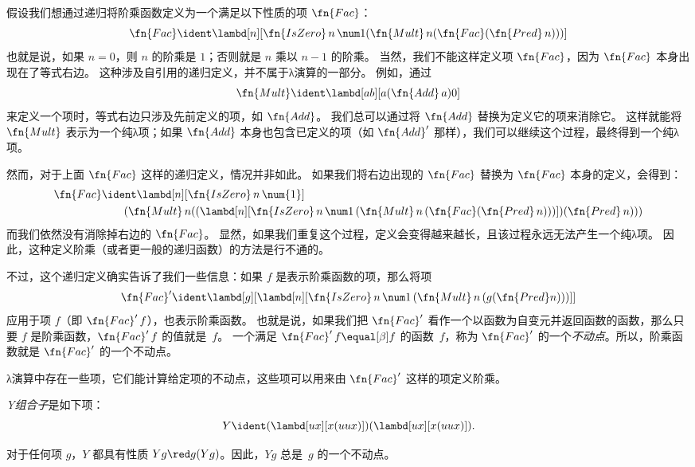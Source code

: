 \documentclass[../../../include/open-logic-section]{subfiles}
\begin{document}


假设我们想通过递归将阶乘函数定义为一个满足以下性质的项 $\fn{Fac}$：
\[
\fn{Fac} \ident \lambd[n][\fn{IsZero}\, n\, \num 1 (\fn{Mult}\, n (\fn{Fac}(\fn{Pred} \, n)))]
\]
也就是说，如果 $n = 0$，则 $n$ 的阶乘是 $1$；否则就是 $n$ 乘以 $n-1$ 的阶乘。
当然，我们不能这样定义项 $\fn{Fac}$，因为 $\fn{Fac}$ 本身出现在了等式右边。
这种涉及自引用的递归定义，并不属于λ演算的一部分。
例如，通过
\[
\fn{Mult} \ident \lambd[ab][a (\fn{Add}\, a) 0]
\]
来定义一个项时，等式右边只涉及先前定义的项，如 $\fn{Add}$。
我们总可以通过将 $\fn{Add}$ 替换为定义它的项来消除它。
这样就能将 $\fn{Mult}$ 表示为一个纯λ项；如果 $\fn{Add}$ 本身也包含已定义的项（如 $\fn{Add}'$ 那样），我们可以继续这个过程，最终得到一个纯λ项。

然而，对于上面 $\fn{Fac}$ 这样的递归定义，情况并非如此。
如果我们将右边出现的 $\fn{Fac}$ 替换为 $\fn{Fac}$ 本身的定义，会得到：
\begin{align*}
  \fn{Fac} & \ident \lambd[n][\fn{IsZero}\, n\, \num{1}] \\
    & \qquad (\fn{Mult}\, n
  ((\lambd[n][\fn{IsZero} \, n \, \num 1\, (\fn{Mult}\, n\, (\fn{Fac}
    (\fn{Pred}\, n)))]) (\fn{Pred}\, n)))
\end{align*}
而我们依然没有消除掉右边的 $\fn{Fac}$。
显然，如果我们重复这个过程，定义会变得越来越长，且该过程永远无法产生一个纯λ项。
因此，这种定义阶乘（或者更一般的递归函数）的方法是行不通的。

不过，这个递归定义确实告诉了我们一些信息：如果 $f$ 是表示阶乘函数的项，那么将项
\[
\fn{Fac}' \ident \lambd[g][\lambd[n][\fn{IsZero} \, n \, \num 1\, (\fn{Mult} \, n\, (g (\fn{Pred} n)))]]
\]
应用于项 $f$（即 $\fn{Fac}'\,f$），也表示阶乘函数。
也就是说，如果我们把 $\fn{Fac}'$ 看作一个以函数为自变元并返回函数的函数，那么只要 $f$ 是阶乘函数，$\fn{Fac}'\, f$ 的值就是~$f$。
一个满足 $\fn{Fac}' \, f \equal[\beta] f$ 的函数~$f$，称为 $\fn{Fac}'$ 的一个\emph{不动点}。所以，阶乘函数就是 $\fn{Fac}'$ 的一个不动点。

λ演算中存在一些项，它们能计算给定项的不动点，这些项可以用来由 $\fn{Fac}'$ 这样的项定义阶乘。

\begin{defn}
  \emph{Y组合子}是如下项：
  \[
  Y \ident (\lambd[ux][x(uux)])(\lambd[ux][x(uux)]).
  \]
\end{defn}

\begin{thm}
  对于任何项 $g$，$Y$ 都具有性质 $Yg \red g(Yg)$。因此，$Yg$ 总是~$g$ 的一个不动点。
\end{thm}
\end{document}
